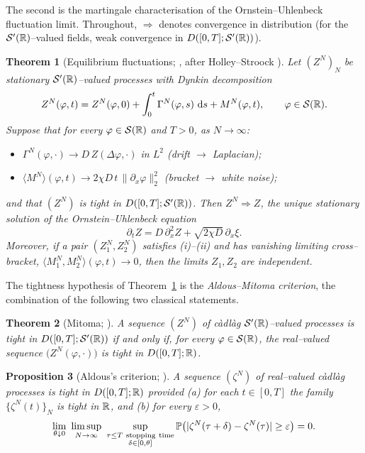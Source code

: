 \documentclass[11pt]{article}
\theoremstyle{plain}
\newtheorem{theorem}{Theorem}[section]
\newtheorem{proposition}[theorem]{Proposition}
\theoremstyle{definition}
\theoremstyle{remark}
\newcommand{\To}{\Rightarrow}\newcommand{\so}{\mathfrak{so}}
\begin{document}
\noindent The second is the martingale characterisation of the Ornstein--Uhlenbeck
fluctuation limit. Throughout, $\To$ denotes convergence in distribution (for the
$\mathcal S'(\mathbb{R})$--valued fields, weak convergence in $D([0,T];\mathcal S'(\mathbb{R}))$).

\begin{theorem}[Equilibrium fluctuations; {\cite[Ch.~11]{KL}}, after Holley--Stroock \cite{HolleyStroock}]\label{thm:mp}
Let $(Z^N)_N$ be stationary $\mathcal S'(\mathbb{R})$--valued processes with Dynkin decomposition
\[
  Z^N(\varphi,t)=Z^N(\varphi,0)+\int_0^t\Gamma^N(\varphi,s)\,\,\mathrm{d} s+M^N(\varphi,t),
  \qquad \varphi\in\mathcal S(\mathbb{R}).
\]
Suppose that for every $\varphi\in\mathcal S(\mathbb{R})$ and $T>0$, as $N\to\infty$:
\begin{itemize}
\item[\textup{(i)}] $\Gamma^N(\varphi,\cdot)\to D\,Z(\Delta\varphi,\cdot)$ in $L^2$
  \quad(drift $\to$ Laplacian);
\item[\textup{(ii)}] $\langle M^N\rangle(\varphi,t)\to 2\chi D\,t\,\|\partial_x\varphi\|_2^2$
  \quad(bracket $\to$ white noise);
\end{itemize}
and that $(Z^N)$ is tight in $D([0,T];\mathcal S'(\mathbb{R}))$. Then $Z^N\To Z$, the \emph{unique}
stationary solution of the Ornstein--Uhlenbeck equation
\[
  \partial_t Z=D\,\partial_x^2 Z+\sqrt{2\chi D}\,\partial_x\xi .
\]
Moreover, if a pair $(Z_1^N,Z_2^N)$ satisfies \textup{(i)--(ii)} and has vanishing
limiting cross--bracket, $\langle M_1^N,M_2^N\rangle(\varphi,t)\to0$, then the limits
$Z_1,Z_2$ are independent.
\end{theorem}

\noindent The tightness hypothesis of Theorem~\ref{thm:mp} is the \emph{Aldous--Mitoma
criterion}, the combination of the following two classical statements.

\begin{theorem}[Mitoma; \cite{Mitoma}]\label{thm:mitoma}
A sequence $(Z^N)$ of c\`adl\`ag $\mathcal S'(\mathbb{R})$--valued processes is tight in
$D([0,T];\mathcal S'(\mathbb{R}))$ if and only if, for every $\varphi\in\mathcal S(\mathbb{R})$, the real--valued
sequence $\big(Z^N(\varphi,\cdot)\big)$ is tight in $D([0,T];\mathbb{R})$.
\end{theorem}

\begin{proposition}[Aldous's criterion; \cite{Aldous}]\label{prop:aldous}
A sequence $(\zeta^N)$ of real--valued c\`adl\`ag processes is tight in $D([0,T];\mathbb{R})$
provided \textup{(a)} for each $t\in[0,T]$ the family $\{\zeta^N(t)\}_N$ is tight in
$\mathbb{R}$, and \textup{(b)} for every $\varepsilon>0$,
\[
  \lim_{\theta\downarrow0}\ \limsup_{N\to\infty}\
  \sup_{\substack{\tau\le T\ \mathrm{stopping\ time}\\ \delta\in[0,\theta]}}
  \PP\big(|\zeta^N(\tau+\delta)-\zeta^N(\tau)|\ge\varepsilon\big)=0 .
\]
\end{proposition}
\end{document}
